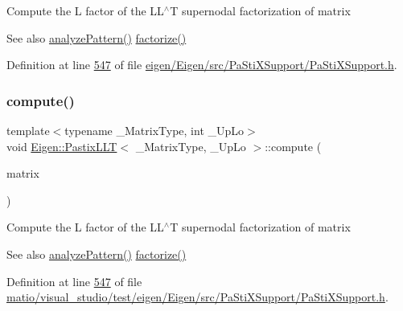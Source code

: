 Compute the L factor of the L\+L$^\wedge$T supernodal factorization of {\ttfamily matrix} \begin{DoxySeeAlso}{See also}
\hyperlink{class_eigen_1_1_pastix_l_l_t_a671e8444ae2f04db3565e35caa958667}{analyze\+Pattern()} \hyperlink{class_eigen_1_1_pastix_l_l_t_a63dac317804b18a4704a519d7bdfaaff}{factorize()} 
\end{DoxySeeAlso}


Definition at line \hyperlink{eigen_2_eigen_2src_2_pa_sti_x_support_2_pa_sti_x_support_8h_source_l00547}{547} of file \hyperlink{eigen_2_eigen_2src_2_pa_sti_x_support_2_pa_sti_x_support_8h_source}{eigen/\+Eigen/src/\+Pa\+Sti\+X\+Support/\+Pa\+Sti\+X\+Support.\+h}.

\mbox{\label{class_eigen_1_1_pastix_l_l_t_a54fcdef53903851e2d8113a6ed330b5c}} 
\subsubsection{\texorpdfstring{compute()}{compute()}\hspace{0.1cm}{\footnotesize\ttfamily [2/2]}}
{\footnotesize\ttfamily template$<$typename \+\_\+\+Matrix\+Type, int \+\_\+\+Up\+Lo$>$ \\
void \hyperlink{class_eigen_1_1_pastix_l_l_t}{Eigen\+::\+Pastix\+L\+LT}$<$ \+\_\+\+Matrix\+Type, \+\_\+\+Up\+Lo $>$\+::compute (\begin{DoxyParamCaption}\item[{const Matrix\+Type \&}]{matrix }\end{DoxyParamCaption})\hspace{0.3cm}{\ttfamily [inline]}}

Compute the L factor of the L\+L$^\wedge$T supernodal factorization of {\ttfamily matrix} \begin{DoxySeeAlso}{See also}
\hyperlink{class_eigen_1_1_pastix_l_l_t_a671e8444ae2f04db3565e35caa958667}{analyze\+Pattern()} \hyperlink{class_eigen_1_1_pastix_l_l_t_a63dac317804b18a4704a519d7bdfaaff}{factorize()} 
\end{DoxySeeAlso}


Definition at line \hyperlink{matio_2visual__studio_2test_2eigen_2_eigen_2src_2_pa_sti_x_support_2_pa_sti_x_support_8h_source_l00547}{547} of file \hyperlink{matio_2visual__studio_2test_2eigen_2_eigen_2src_2_pa_sti_x_support_2_pa_sti_x_support_8h_source}{matio/visual\+\_\+studio/test/eigen/\+Eigen/src/\+Pa\+Sti\+X\+Support/\+Pa\+Sti\+X\+Support.\+h}.

